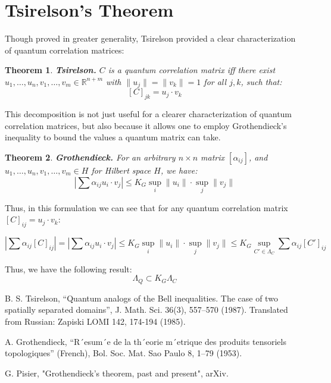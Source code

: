 \documentclass[psamsfonts]{amsart}
\newtheorem{thm}{Theorem}[section]
\theoremstyle{definition}
\theoremstyle{remark}
\numberwithin{equation}{section}
\begin{document}
\section{Tsirelson's Theorem}

Though proved in greater generality, Tsirelson provided a clear characterization of quantum correlation matrices:

\begin{thm}
	{\bf Tsirelson.} $C$ is a quantum correlation matrix iff there exist $u_1, \dots, u_n, v_1, \dots, v_m \in \mathbb{R}^{n+m}$ with $\|u_j\| = \|v_k\| = 1$ for all $j,k$, such that:
	$$[C]_{jk} = u_j \cdot v_k$$
\end{thm}

This decomposition is not just useful for a clearer characterization of quantum correlation matrices, but also because it allows one to employ Grothendieck's inequality to bound the values a quantum matrix can take. 

\begin{thm}
	{\bf Grothendieck.} For an arbitrary $n\times n$ matrix $[\alpha_{ij}]$, and $u_1, \dots, u_n, v_1, \dots, v_m \in H$ for Hilbert space $H$, we have:
	$$\left| \sum \alpha_{ij} u_i \cdot v_j \right| \leq K_G \sup_i \|u_i\| \cdot \sup_j \|v_j\|$$ 
\end{thm}

Thus, in this formulation we can see that for any quantum correlation matrix $[C]_{ij} = u_j \cdot v_k$:

$$\left| \sum \alpha_{ij}  [C]_{ij}\right|  =\left| \sum \alpha_{ij}  u_i \cdot v_j\right| \leq K_G \sup_i \|u_i\| \cdot \sup_j \|v_j\| \leq K_G \sup_{C' \in \Lambda_C} \sum \alpha_{ij} [C']_{ij}$$

Thus, we have the following result:
$$\Lambda_Q \subset K_G \Lambda_C$$

\begin{thebibliography}{9}

B. S. Tsirelson, “Quantum analogs of the Bell inequalities. The case of two spatially separated domains”,
J. Math. Sci. 36(3), 557–570 (1987). Translated from Russian: Zapiski LOMI 142, 174-194 (1985).

A. Grothendieck, “R´esum´e de la th´eorie m´etrique des produits tensoriels topologiques” (French), Bol. Soc.
Mat. Sao Paulo 8, 1–79 (1953).

G. Pisier, "Grothendieck's theorem, past and present", arXiv.

\end{thebibliography}
\end{document}
